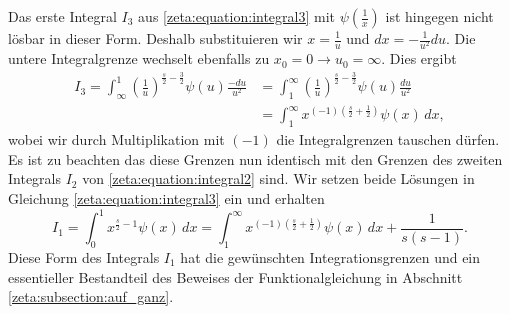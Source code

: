 Das erste Integral $I_3$ aus \eqref{zeta:equation:integral3} mit $\psi \left(\frac{1}{x} \right)$ ist hingegen nicht lösbar in dieser Form.
Deshalb substituieren wir $x = \frac{1}{u}$ und $dx = -\frac{1}{u^2}du$.
Die untere Integralgrenze wechselt ebenfalls zu $x_0 = 0 \rightarrow u_0 = \infty$.
Dies ergibt
\begin{align}
    I_3
    =
    \int_{\infty}^{1}
    \left(
    \frac{1}{u}
    \right)^{\frac{s}{2}-\frac{3}{2}}
    \psi(u)
    \frac{-du}{u^2}
    &=
    \int_{1}^{\infty}
    \left(
    \frac{1}{u}
    \right)^{\frac{s}{2}-\frac{3}{2}}
    \psi(u)
    \frac{du}{u^2}
    \\
    &=
    \int_{1}^{\infty}
    x^{(-1) \left(\frac{s}{2}+\frac{1}{2}\right)}
    \psi(x)
    \,dx,
\end{align}
wobei wir durch Multiplikation mit $(-1)$ die Integralgrenzen tauschen dürfen.
Es ist zu beachten das diese Grenzen nun identisch mit den Grenzen des zweiten Integrals $I_2$ von \eqref{zeta:equation:integral2} sind.
Wir setzen beide Lösungen in Gleichung \eqref{zeta:equation:integral3} ein und erhalten
\begin{equation}
    I_1
    =
    \int_0^{1}
    x^{\frac{s}{2}-1}
    \psi(x)
    \,dx
    =
    \int_{1}^{\infty}
    x^{(-1) \left(\frac{s}{2}+\frac{1}{2}\right)}
    \psi(x)
    \,dx
    +
    \frac{1}{s(s-1)}. \label{zeta:equation:intcal_res}
\end{equation}
Diese Form des Integrals $I_1$ hat die gewünschten Integrationsgrenzen und ein essentieller Bestandteil des Beweises der Funktionalgleichung in Abschnitt \ref{zeta:subsection:auf_ganz}.
